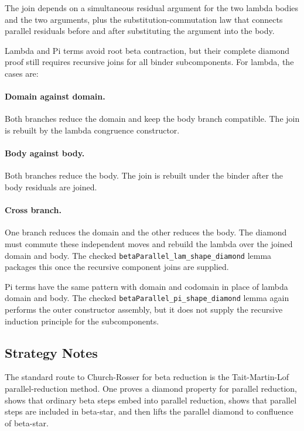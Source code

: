 The join depends on a simultaneous residual argument for the two lambda bodies
and the two arguments, plus the substitution-commutation law that connects
parallel residuals before and after substituting the argument into the body.

Lambda and Pi terms avoid root beta contraction, but their complete diamond
proof still requires recursive joins for all binder subcomponents. For lambda,
the cases are:

\paragraph{Domain against domain.}
Both branches reduce the domain and keep the body branch compatible. The join
is rebuilt by the lambda congruence constructor.

\paragraph{Body against body.}
Both branches reduce the body. The join is rebuilt under the binder after the
body residuals are joined.

\paragraph{Cross branch.}
One branch reduces the domain and the other reduces the body. The diamond must
commute these independent moves and rebuild the lambda over the joined domain
and body. The checked \texttt{betaParallel\_lam\_shape\_diamond} lemma packages
this once the recursive component joins are supplied.

Pi terms have the same pattern with domain and codomain in place of lambda
domain and body. The checked \texttt{betaParallel\_pi\_shape\_diamond} lemma
again performs the outer constructor assembly, but it does not supply the
recursive induction principle for the subcomponents.

\subsection{Strategy Notes}
\label{subsec:metacic-confluence-strategy-notes}

The standard route to Church-Rosser for beta reduction is the
Tait-Martin-Lof parallel-reduction method. One proves a diamond property for
parallel reduction, shows that ordinary beta steps embed into parallel
reduction, shows that parallel steps are included in beta-star, and then lifts
the parallel diamond to confluence of beta-star.

